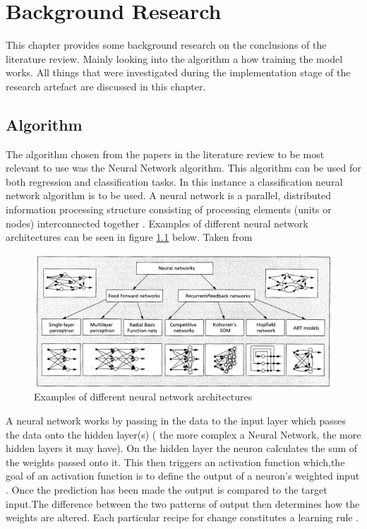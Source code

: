 \chapter{Background Research}\label{ch:Background Research}
This chapter provides some background research on the conclusions of the literature review. Mainly looking into the algorithm a how training the model works. All things that were investigated during the implementation stage of the research artefact are discussed in this chapter.

\section{Algorithm}
The algorithm chosen from the papers in the literature review to be most relevant to use was the Neural Network algorithm. This algorithm can be used for both regression and classification tasks. In this instance a classification neural network algorithm is to be used. A neural network is a parallel, distributed information processing structure consisting of processing elements (units or nodes) interconnected together \cite{118638}. Examples of different neural network architectures can be seen in figure \ref{fig:NNA} below. Taken from \cite{485891} 
\begin{figure}[h!]
  \centering
  \includegraphics[width = (\textwidth)/2]{nnarc.png}
  \caption{Examples of different neural network architectures}
  \label{fig:NNA}
\end{figure}

A neural network works by passing in the data to the input layer which passes the data onto the hidden layer(s) ( the more complex a Neural Network, the more hidden layers it may have). On the hidden layer the neuron calculates the sum of the weights passed onto it. This then triggers an activation function which,the goal of an activation function is to define the output of a neuron's weighted input \cite{samatin_njikam_zhao_2016}. Once the prediction has been made the output is compared to the target input.The difference between the two patterns of output then determines how the weights are altered. Each particular recipe for change constitutes a learning rule \cite{Gurney1997AnIT}.

